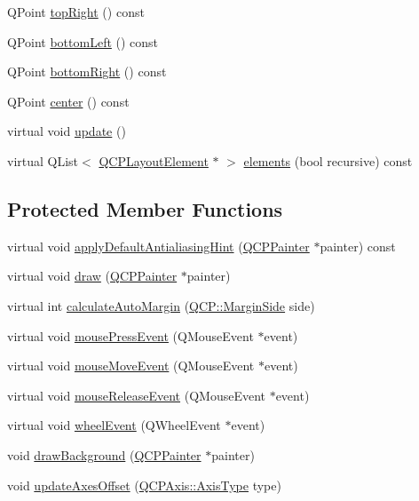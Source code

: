 \begin{DoxyCompactItemize}
\item 
Q\-Point \hyperlink{class_q_c_p_axis_rect_a232409546394c23b59407bc62fa460a8}{top\-Right} () const 
\item 
Q\-Point \hyperlink{class_q_c_p_axis_rect_a724b0333971ea6a338f0dbd814dc97ae}{bottom\-Left} () const 
\item 
Q\-Point \hyperlink{class_q_c_p_axis_rect_a49ea3c7dff834b47e266cbf3d79f78b9}{bottom\-Right} () const 
\item 
Q\-Point \hyperlink{class_q_c_p_axis_rect_aea5e6042bca198424fa1bc02fc282e59}{center} () const 
\item 
virtual void \hyperlink{class_q_c_p_axis_rect_a8bdf6f76baa7b6c464706bce9b975a27}{update} ()
\item 
virtual Q\-List$<$ \hyperlink{class_q_c_p_layout_element}{Q\-C\-P\-Layout\-Element} $\ast$ $>$ \hyperlink{class_q_c_p_axis_rect_a2bda6bf2b5b5797f92583cecd01c8949}{elements} (bool recursive) const 
\end{DoxyCompactItemize}
\subsection*{Protected Member Functions}
\begin{DoxyCompactItemize}
\item 
virtual void \hyperlink{class_q_c_p_axis_rect_a9a6dd0763701cbc7d01f899bcbb3f9ca}{apply\-Default\-Antialiasing\-Hint} (\hyperlink{class_q_c_p_painter}{Q\-C\-P\-Painter} $\ast$painter) const 
\item 
virtual void \hyperlink{class_q_c_p_axis_rect_afb1bbbbda8345cd2710d92ee48440b53}{draw} (\hyperlink{class_q_c_p_painter}{Q\-C\-P\-Painter} $\ast$painter)
\item 
virtual int \hyperlink{class_q_c_p_axis_rect_ae79f18302e6507586aa8c032a5f9ed1c}{calculate\-Auto\-Margin} (\hyperlink{namespace_q_c_p_a7e487e3e2ccb62ab7771065bab7cae54}{Q\-C\-P\-::\-Margin\-Side} side)
\item 
virtual void \hyperlink{class_q_c_p_axis_rect_a77501dbeccdac7256f7979b05077c04e}{mouse\-Press\-Event} (Q\-Mouse\-Event $\ast$event)
\item 
virtual void \hyperlink{class_q_c_p_axis_rect_a4baf3d5dd69166788f6ceda0ea182c6e}{mouse\-Move\-Event} (Q\-Mouse\-Event $\ast$event)
\item 
virtual void \hyperlink{class_q_c_p_axis_rect_adf6c99780cea55ab39459a6eaad3a94a}{mouse\-Release\-Event} (Q\-Mouse\-Event $\ast$event)
\item 
virtual void \hyperlink{class_q_c_p_axis_rect_a5acf41fc30aa68ea263246ecfad85c31}{wheel\-Event} (Q\-Wheel\-Event $\ast$event)
\item 
void \hyperlink{class_q_c_p_axis_rect_ab49d338d1ce74b476fcead5b32cf06dc}{draw\-Background} (\hyperlink{class_q_c_p_painter}{Q\-C\-P\-Painter} $\ast$painter)
\item 
void \hyperlink{class_q_c_p_axis_rect_a6024ccdc74f5dc0e8a0fe482e5b28a20}{update\-Axes\-Offset} (\hyperlink{class_q_c_p_axis_ae2bcc1728b382f10f064612b368bc18a}{Q\-C\-P\-Axis\-::\-Axis\-Type} type)
\end{DoxyCompactItemize}
